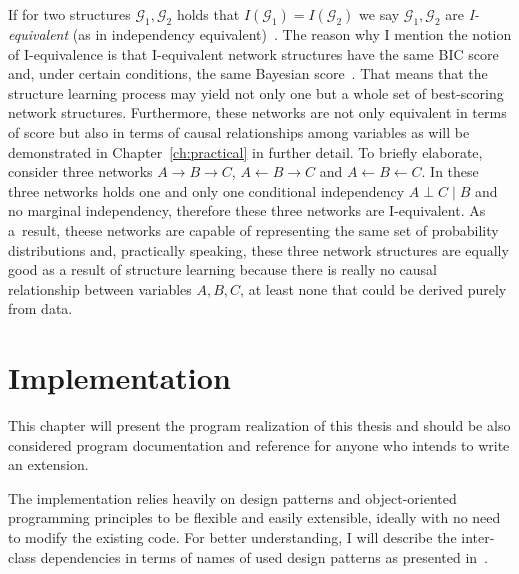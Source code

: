 \documentclass[english,cover]{fitthesis} %
\newcommand{\term}[1]{\emph{#1}}           %
\begin{document}
If for two structures $\mathcal{G}_1, \mathcal{G}_2$ holds that $I(\mathcal{G}_1) = I(\mathcal{G}_2)$ we say $\mathcal{G}_1, \mathcal{G}_2$ are \term{I-equivalent} (as in independency equivalent)~\cite[p.~76]{pgm}. The reason why I mention the notion of I-equivalence is that I-equivalent network structures have the same BIC score and, under certain conditions, the same Bayesian score~\cite[p.~807]{pgm}. That means that the structure learning process may yield not only one but a whole set of best-scoring network structures. Furthermore, these networks are not only equivalent in terms of score but also in terms of causal relationships among variables as will be demonstrated in Chapter~\ref{ch:practical} in further detail. To briefly elaborate, consider three networks $A \rightarrow B \rightarrow C$, $A \leftarrow B \rightarrow C$ and $A \leftarrow B \leftarrow C$. In these three networks holds one and only one conditional independency $A \perp C \mid B$ and no marginal independency, therefore these three networks are I-equivalent. As a~result, theese networks are capable of representing the same set of probability distributions and, practically speaking, these three network structures are equally good as a result of structure learning because there is really no causal relationship between variables $A,B,C$, at least none that could be derived purely from data.




























\chapter{Implementation}\label{ch:implementation}
This chapter will present the program realization of this thesis and should be also considered program documentation and reference for anyone who intends to write an extension.

The implementation relies heavily on design patterns and object-oriented programming principles to be flexible and easily extensible, ideally with no need to modify the existing code. For better understanding, I will describe the inter-class dependencies in terms of names of used design patterns as presented in~\cite{head_first_design_patterns}.
\end{document}
